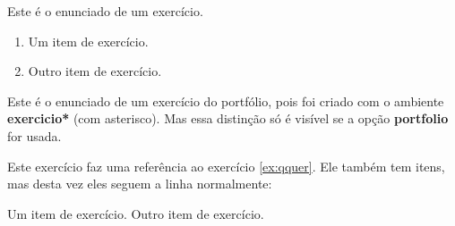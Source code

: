 \documentclass[a4paper]{article}
\newcommand\code[1]{\textbf{#1}}
\begin{document}
  \begin{exercicio}
    Este é o enunciado de um exercício.
    \begin{enumerate}
      \item Um item de exercício.
      \item Outro item de exercício.
    \end{enumerate}
  \end{exercicio}

  \begin{exercicio*}\label{ex:qquer}%
    Este é o enunciado de um exercício do portfólio, pois foi criado com o ambiente \code{exercicio*} (com asterisco).
    Mas essa distinção só é visível se a opção \code{portfolio} for usada.  
  \end{exercicio*}

  \begin{exercicio}
    Este exercício faz uma referência ao exercício \ref{ex:qquer}.
    Ele também tem itens, mas desta vez eles seguem a linha normalmente:%
    \begin{inlineenum}
      \inlineitem Um item de exercício.
      \inlineitem Outro item de exercício.
    \end{inlineenum}

  \end{exercicio}
\end{document}
